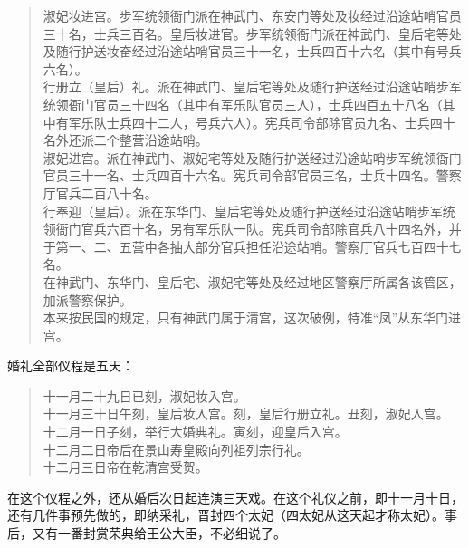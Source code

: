 \begin{quote}
	淑妃妆进宫。步军统领衙门派在神武门、东安门等处及妆经过沿途站哨官员三十名，士兵三百名。皇后妆进官。步军统领衙门派在神武门、皇后宅等处及随行护送妆奋经过沿途站哨官员三十一名，士兵四百十六名（其中有号兵六名）。\\

行册立（皇后）礼。派在神武门、皇后宅等处及随行护送经过沿途站哨步军统领衙门官员三十四名（其中有军乐队官员三人），士兵四百五十八名（其中有军乐队士兵四十二人，号兵六人）。宪兵司令部除官员九名、士兵四十名外还派二个整营沿途站哨。\\

淑妃进宫。派在神武门、淑妃宅等处及随行护送经过沿途站哨步军统领衙门官员三十一名、士兵四百十六名。宪兵司令部官员三名，士兵十四名。警察厅官兵二百八十名。\\

行奉迎（皇后）。派在东华门、皇后宅等处及随行护送经过沿途站哨步军统领衙门官兵六百十名，另有军乐队一队。宪兵司令部除官兵八十四名外，并于第一、二、五营中各抽大部分官兵担任沿途站哨。警察厅官兵七百四十七名。\\

在神武门、东华门、皇后宅、淑妃宅等处及经过地区警察厅所属各该管区，加派警察保护。\\

本来按民国的规定，只有神武门属于清宫，这次破例，特准“凤”从东华门进宫。\\
\end{quote}

婚礼全部仪程是五天：\\

\begin{quote}
	十一月二十九日已刻，淑妃妆入宫。\\

十一月三十日午刻，皇后妆入宫。刻，皇后行册立礼。丑刻，淑妃入宫。\\

十二月一日子刻，举行大婚典礼。寅刻，迎皇后入宫。\\

十二月二日帝后在景山寿皇殿向列祖列宗行礼。\\

十二月三日帝在乾清宫受贺。\\
\end{quote}

在这个仪程之外，还从婚后次日起连演三天戏。在这个礼仪之前，即十一月十日，还有几件事预先做的，即纳采礼，晋封四个太妃（四太妃从这天起才称太妃）。事后，又有一番封赏荣典给王公大臣，不必细说了。\\

